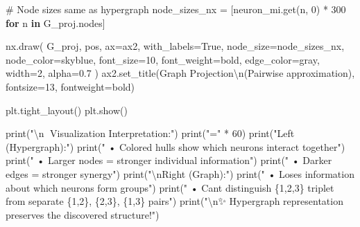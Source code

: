 \documentclass[
  11pt,
  letterpaper,
  oneside,
  openany]{book}
\newenvironment{Shaded}{\begin{snugshade}}{\end{snugshade}}
\newcommand{\BuiltInTok}[1]{\textcolor[rgb]{0.00,0.23,0.31}{#1}}
\newcommand{\CharTok}[1]{\textcolor[rgb]{0.13,0.47,0.30}{#1}}
\newcommand{\CommentTok}[1]{\textcolor[rgb]{0.37,0.37,0.37}{#1}}
\newcommand{\ControlFlowTok}[1]{\textcolor[rgb]{0.00,0.23,0.31}{\textbf{#1}}}
\newcommand{\DecValTok}[1]{\textcolor[rgb]{0.68,0.00,0.00}{#1}}
\newcommand{\FloatTok}[1]{\textcolor[rgb]{0.68,0.00,0.00}{#1}}
\newcommand{\KeywordTok}[1]{\textcolor[rgb]{0.00,0.23,0.31}{\textbf{#1}}}
\newcommand{\NormalTok}[1]{\textcolor[rgb]{0.00,0.23,0.31}{#1}}
\newcommand{\OperatorTok}[1]{\textcolor[rgb]{0.37,0.37,0.37}{#1}}
\newcommand{\StringTok}[1]{\textcolor[rgb]{0.13,0.47,0.30}{#1}}
\newcommand{\VariableTok}[1]{\textcolor[rgb]{0.07,0.07,0.07}{#1}}
\begin{document}
\begin{Shaded}
\begin{Highlighting}[]
\CommentTok{\# Node sizes same as hypergraph}
\NormalTok{node\_sizes\_nx }\OperatorTok{=}\NormalTok{ [neuron\_mi.get(n, }\DecValTok{0}\NormalTok{) }\OperatorTok{*} \DecValTok{300} \ControlFlowTok{for}\NormalTok{ n }\KeywordTok{in}\NormalTok{ G\_proj.nodes]}

\NormalTok{nx.draw(}
\NormalTok{    G\_proj,}
\NormalTok{    pos,}
\NormalTok{    ax}\OperatorTok{=}\NormalTok{ax2,}
\NormalTok{    with\_labels}\OperatorTok{=}\VariableTok{True}\NormalTok{,}
\NormalTok{    node\_size}\OperatorTok{=}\NormalTok{node\_sizes\_nx,}
\NormalTok{    node\_color}\OperatorTok{=}\StringTok{\textquotesingle{}skyblue\textquotesingle{}}\NormalTok{,}
\NormalTok{    font\_size}\OperatorTok{=}\DecValTok{10}\NormalTok{,}
\NormalTok{    font\_weight}\OperatorTok{=}\StringTok{\textquotesingle{}bold\textquotesingle{}}\NormalTok{,}
\NormalTok{    edge\_color}\OperatorTok{=}\StringTok{\textquotesingle{}gray\textquotesingle{}}\NormalTok{,}
\NormalTok{    width}\OperatorTok{=}\DecValTok{2}\NormalTok{,}
\NormalTok{    alpha}\OperatorTok{=}\FloatTok{0.7}
\NormalTok{)}
\NormalTok{ax2.set\_title(}\StringTok{\textquotesingle{}Graph Projection}\CharTok{\textbackslash{}n}\StringTok{(Pairwise approximation)\textquotesingle{}}\NormalTok{, }
\NormalTok{              fontsize}\OperatorTok{=}\DecValTok{13}\NormalTok{, fontweight}\OperatorTok{=}\StringTok{\textquotesingle{}bold\textquotesingle{}}\NormalTok{)}

\NormalTok{plt.tight\_layout()}
\NormalTok{plt.show()}

\BuiltInTok{print}\NormalTok{(}\StringTok{"}\CharTok{\textbackslash{}n}\StringTok{🎨 Visualization Interpretation:"}\NormalTok{)}
\BuiltInTok{print}\NormalTok{(}\StringTok{"="} \OperatorTok{*} \DecValTok{60}\NormalTok{)}
\BuiltInTok{print}\NormalTok{(}\StringTok{"Left (Hypergraph):"}\NormalTok{)}
\BuiltInTok{print}\NormalTok{(}\StringTok{"  • Colored hulls show which neurons interact together"}\NormalTok{)}
\BuiltInTok{print}\NormalTok{(}\StringTok{"  • Larger nodes = stronger individual information"}\NormalTok{)}
\BuiltInTok{print}\NormalTok{(}\StringTok{"  • Darker edges = stronger synergy"}\NormalTok{)}
\BuiltInTok{print}\NormalTok{(}\StringTok{"}\CharTok{\textbackslash{}n}\StringTok{Right (Graph):"}\NormalTok{)}
\BuiltInTok{print}\NormalTok{(}\StringTok{"  • Loses information about which neurons form groups"}\NormalTok{)}
\BuiltInTok{print}\NormalTok{(}\StringTok{"  • Can\textquotesingle{}t distinguish \{1,2,3\} triplet from separate \{1,2\}, \{2,3\}, \{1,3\} pairs"}\NormalTok{)}
\BuiltInTok{print}\NormalTok{(}\StringTok{"}\CharTok{\textbackslash{}n}\StringTok{✨ Hypergraph representation preserves the discovered structure!"}\NormalTok{)}
\end{Highlighting}
\end{Shaded}
\end{document}
